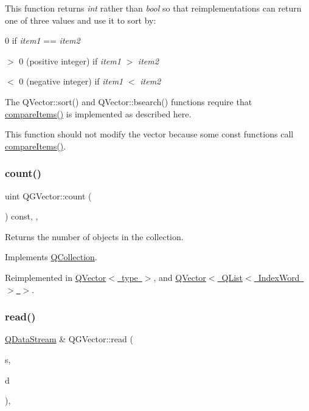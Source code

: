 This function returns {\itshape int} rather than {\itshape bool} so that reimplementations can return one of three values and use it to sort by\+:


\begin{DoxyItemize}
\item 0 if {\itshape item1} == {\itshape item2} 
\item $>$ 0 (positive integer) if {\itshape item1} $>$ {\itshape item2} 
\item $<$ 0 (negative integer) if {\itshape item1} $<$ {\itshape item2} 
\end{DoxyItemize}

The Q\+Vector\+::sort() and Q\+Vector\+::bsearch() functions require that \mbox{\hyperlink{class_q_g_vector_a65a79a6de037a4033ead55891622f5e2}{compare\+Items()}} is implemented as described here.

This function should not modify the vector because some const functions call \mbox{\hyperlink{class_q_g_vector_a65a79a6de037a4033ead55891622f5e2}{compare\+Items()}}. \mbox{\label{class_q_g_vector_a24cdcea0593a3c9334d130e66c8e2043}} 
\subsubsection{\texorpdfstring{count()}{count()}}
{\footnotesize\ttfamily uint Q\+G\+Vector\+::count (\begin{DoxyParamCaption}{ }\end{DoxyParamCaption}) const\hspace{0.3cm}{\ttfamily [inline]}, {\ttfamily [protected]}, {\ttfamily [virtual]}}

Returns the number of objects in the collection. 

Implements \mbox{\hyperlink{class_q_collection_a6441adbfb3ffb6f55ed834c0c0bcc6cb}{Q\+Collection}}.



Reimplemented in \mbox{\hyperlink{class_q_vector_a7fa63591f2256a78f5ba439cc858b09d}{Q\+Vector$<$ type $>$}}, and \mbox{\hyperlink{class_q_vector_a7fa63591f2256a78f5ba439cc858b09d}{Q\+Vector$<$ Q\+List$<$ Index\+Word $>$ $>$}}.

\mbox{\label{class_q_g_vector_a6ffba6b62053655e2d5aec0138a2e128}} 
\subsubsection{\texorpdfstring{read()}{read()}}
{\footnotesize\ttfamily \mbox{\hyperlink{class_q_data_stream}{Q\+Data\+Stream}} \& Q\+G\+Vector\+::read (\begin{DoxyParamCaption}\item[{\mbox{\hyperlink{class_q_data_stream}{Q\+Data\+Stream}} \&}]{s,  }\item[{Item \&}]{d }\end{DoxyParamCaption})\hspace{0.3cm}{\ttfamily [protected]}, {\ttfamily [virtual]}}

